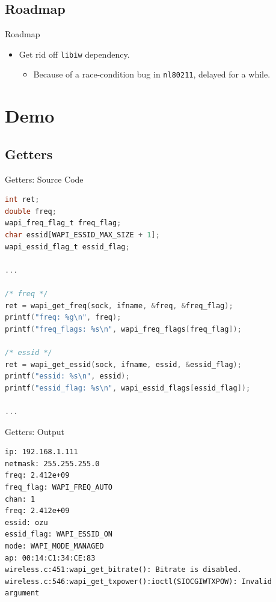 \documentclass[turkish,12pt,red,compress,mathserif]{beamer}
\begin{document}

\subsection{Roadmap}

\begin{frame}{Roadmap}
  \begin{itemize}
  \item Get rid off \texttt{libiw} dependency.
    \begin{itemize}
    \item Because of a race-condition bug in \texttt{nl80211}, delayed for a
      while.
    \end{itemize}
  \end{itemize}
\end{frame}



\section{Demo}


\subsection{Getters}

\begin{frame}[fragile]{Getters: Source Code}
  \begin{lstlisting}[language=c]
int ret;
double freq;
wapi_freq_flag_t freq_flag;
char essid[WAPI_ESSID_MAX_SIZE + 1];
wapi_essid_flag_t essid_flag;

...

/* freq */
ret = wapi_get_freq(sock, ifname, &freq, &freq_flag);
printf("freq: %g\n", freq);
printf("freq_flags: %s\n", wapi_freq_flags[freq_flag]);

/* essid */
ret = wapi_get_essid(sock, ifname, essid, &essid_flag);
printf("essid: %s\n", essid);
printf("essid_flag: %s\n", wapi_essid_flags[essid_flag]);

...
  \end{lstlisting}
\end{frame}

\begin{frame}[fragile]{Getters: Output}
  \begin{lstlisting}
ip: 192.168.1.111
netmask: 255.255.255.0
freq: 2.412e+09
freq_flag: WAPI_FREQ_AUTO
chan: 1
freq: 2.412e+09
essid: ozu
essid_flag: WAPI_ESSID_ON
mode: WAPI_MODE_MANAGED
ap: 00:14:C1:34:CE:83
wireless.c:451:wapi_get_bitrate(): Bitrate is disabled.
wireless.c:546:wapi_get_txpower():ioctl(SIOCGIWTXPOW): Invalid argument
  \end{lstlisting}
\end{frame}
\end{document}
